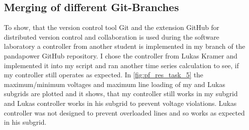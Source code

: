 \documentclass[conference]{IEEEtran}
\begin{document}
\subsection*{Merging of different Git-Branches}
To show, that the version control tool Git and the extension GitHub for distributed version control and collaboration is used during the software laboratory a controller from another student is implemented in my branch of the pandapower GitHub repository. I chose the controller from Lukas Kramer and implemented it into my script and ran another time series calculation to see, if my controller still operates as expected. In \cref{fig:pf_res_task_5} the maximum/minimum voltages and maximum line loading of my and Lukas subgrids are plotted and it shows, that my controller still works in my subgrid and Lukas controller works in his subgrid to prevent voltage violations. Lukas controller was not designed to prevent overloaded lines and so works as expected in his subgrid. 
 

\end{document}
